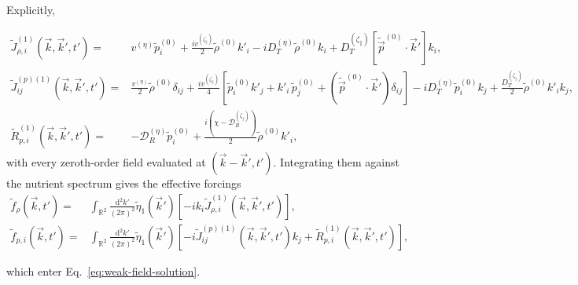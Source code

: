 \documentclass[
  reprint,
  superscriptaddress,
  amsmath,
  amssymb,
  aps,
  pre,
  nofootinbib,
  floatfix
]{revtex4-2}
\newcommand{\pv}{\vec p}
\newcommand{\dd}{\mathrm d}
\newcommand{\zp}{\zeta_\parallel}
\begin{document}
Explicitly,
\begin{widetext}
\begin{align}
 \tilde J_{\rho,i}^{(1)}(\vec k,\vec k',t')
 ={}&v^{(\eta)}\tilde p_i^{(0)}
 +\frac{i v^{(\zp)}}{2}\tilde\rho^{(0)} k'_i
 -iD_T^{(\eta)}\tilde\rho^{(0)} k_i
 +D_T^{(\zp)}\left[\tilde\pv^{(0)}\cdot\vec k'\right] k_i,
 \label{eq:weak-density-flux}\\
 \tilde J_{ij}^{(p)(1)}(\vec k,\vec k',t')
 ={}&\frac{v^{(\eta)}}{2}\tilde\rho^{(0)}\delta_{ij}
 +\frac{i v^{(\zp)}}{4}\left[
 \tilde p_i^{(0)} k'_j
 + k'_i\,\tilde p_j^{(0)}
 +\left(\tilde\pv^{(0)}\cdot\vec k'\right)\delta_{ij}
 \right]
 -iD_T^{(\eta)}\tilde p_i^{(0)} k_j
 +\frac{D_T^{(\zp)}}{2}\tilde\rho^{(0)} k'_i k_j,
 \label{eq:weak-polarity-flux}\\
 \tilde R_{p,i}^{(1)}(\vec k,\vec k',t')
 ={}&-\mathcal D_R^{(\eta)}\tilde p_i^{(0)}
 +\frac{i(\chi - \mathcal D_R^{(\zp)})}{2}\tilde\rho^{(0)} k'_i,
 \label{eq:weak-polarity-source}
\end{align}
with every zeroth-order field evaluated at $(\vec k-\vec k',t')$.
Integrating them against the nutrient spectrum gives the effective forcings
\begin{align}
 \tilde f_\rho(\vec k,t')
 ={}&\int_{\mathbb R^2}\frac{\dd^2k'}{(2\pi)^2}\tilde\eta_1(\vec k')\left[-i k_i \tilde J_{\rho,i}^{(1)}(\vec k,\vec k',t')\right],
 \label{eq:weak-density-forcing}\\
 \tilde f_{p,i}(\vec k,t')
 ={}&\int_{\mathbb R^2}\frac{\dd^2k'}{(2\pi)^2}\tilde\eta_1(\vec k')\left[-i \tilde J_{ij}^{(p)(1)}(\vec k,\vec k',t') k_j + \tilde R_{p,i}^{(1)}(\vec k,\vec k',t')\right],
 \label{eq:weak-polarity-forcing}
\end{align}
\end{widetext}

which enter Eq.~\eqref{eq:weak-field-solution}.
\end{document}
